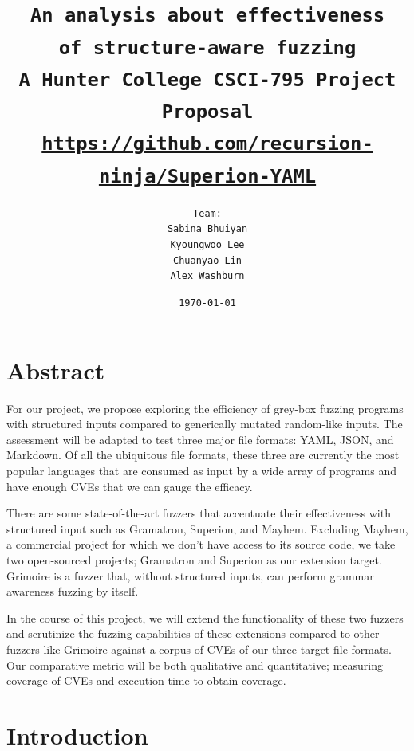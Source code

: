 \documentclass[12pt]{diazessay}
\title{\texttt{\huge{An analysis about effectiveness\\\vspace{-3mm}of structure-aware fuzzing} \\\vspace{-0.35cm} {\large A Hunter College CSCI-795 Project Proposal}\\\normalsize\url{https://github.com/recursion-ninja/Superion-YAML}}} %
\author{\texttt{{\Huge Team:}\\\vspace*{-0.5em} 
		Sabina Bhuiyan \\\vspace*{-0.5em} 
		Kyoungwoo Lee \\\vspace*{-0.5em}
		Chuanyao Lin \\\vspace*{-0.25em}
		Alex Washburn}} %
\date{\texttt{\today}} %
\begin{document}
\maketitle %

\vspace{2cm}
\section*{Abstract}


For our project, we propose exploring the efficiency of grey-box fuzzing programs with structured inputs compared to generically mutated random-like inputs.
The assessment will be adapted to test three major file formats: YAML, JSON, and Markdown.
Of all the ubiquitous file formats, these three are currently the most popular languages that are consumed as input by a wide array of programs and have enough CVEs that we can gauge the efficacy.

There are some state-of-the-art fuzzers that accentuate their effectiveness with structured input such as Gramatron, Superion, and Mayhem.
Excluding Mayhem, a commercial project for which we don't have access to its source code, we take two open-sourced projects; Gramatron and Superion as our extension target.
Grimoire is a fuzzer that, without structured inputs, can perform grammar awareness fuzzing by itself.

In the course of this project, we will extend the functionality of these two fuzzers and scrutinize the fuzzing capabilities of these extensions compared to other fuzzers like Grimoire against a corpus of CVEs of our three target file formats.
Our comparative metric will be both qualitative and quantitative; measuring coverage of CVEs and execution time to obtain coverage.

\clearpage

\section*{Introduction}
\end{document}
